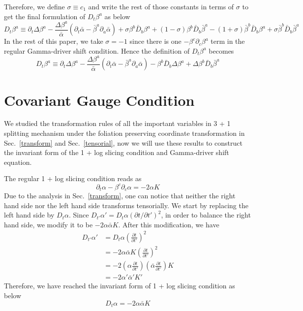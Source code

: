 \documentclass[letterpaper,nofootinbib,prd,amsmath,onecolumn]{revtex4-1}
\begin{document}
Therefore, we define $\sigma \equiv c_{1}$ and write the rest of those constants in terms of $\sigma$ to get the final formulation of $D_{t}\beta^{a}$ as below
\begin{equation}
D_{t}\beta^{a} \equiv \partial_{t}\Delta \beta^{a} - \frac{\Delta \beta^{a}}{{\bar \alpha}}(\partial_{t}{\bar \alpha} - {\bar \beta}^{a}\partial_{a}{\bar \alpha}) + \sigma\beta^{b}{\bar D}_{b}\beta^{a} + (1-\sigma)\beta^{b}{\bar D}_{b}{\bar \beta}^{a} - (1 + \sigma){\bar \beta}^{b}{\bar D}_{b}\beta^{a} + \sigma{\bar \beta}^{b}{\bar D}_{b}{\bar \beta}^{a}
\end{equation}
In the rest of this paper, we take $\sigma = -1$ since there is one $-\beta^{c}\partial_{c}\beta^{a}$ term in the regular Gamma-driver shift condition. Hence the definition of $D_{t}\beta^{a}$ becomes
\begin{equation}
D_{t}\beta^{a} \equiv \partial_{t}\Delta \beta^{a} - \frac{\Delta \beta^{a}}{{\bar \alpha}}(\partial_{t}{\bar \alpha} - {\bar \beta}^{a}\partial_{a}{\bar \alpha}) - \beta^{b}{\bar D}_{b}\Delta \beta^{a} + \Delta \beta^{b}{\bar D}_{b}{\bar \beta}^{a}
\end{equation}

\section{Covariant Gauge Condition}\label{gauge}
We studied the transformation rules of all the important variables in 3 + 1 splitting mechanism under the foliation preserving coordinate transformation in Sec.~\ref{transform} and Sec.~\ref{tensorial}, now we will use these results to construct the invariant form of the 1 + log slicing condition and Gamma-driver shift equation. 

The regular 1 + log slicing condition reads as
\begin{equation}\label{1 + log slicing}
\partial_{t}\alpha - \beta^{c}\partial_{c}\alpha = -2\alpha K
\end{equation}
Due to the analysis in Sec.~\ref{transform}, one can notice that neither the right hand side nor the left hand side transforms tensorially. We start by replacing the left hand side by $D_{t}\alpha$. Since $D_{t'}\alpha' = D_{t}\alpha(\partial t/\partial t')^{2}$, in order to balance the right hand side, we modify it to be $-2\alpha {\bar \alpha}K$. After this modification, we have
\begin{align*}
D_{t'}\alpha' & = D_{t}\alpha\left(\frac{\partial t}{\partial t'}\right)^{2}\\
& = -2\alpha{\bar \alpha}K\left(\frac{\partial t}{\partial t'}\right)^{2}\\
& = -2\left(\alpha\frac{\partial t}{\partial t'}\right)\left({\bar \alpha}\frac{\partial t}{\partial t'}\right)K\\
& = -2\alpha'{\bar \alpha}'K'
\end{align*}
Therefore, we have reached the invariant form of 1 + log slicing condition as below
\begin{equation}\label{invariant 1 + log slicing}
D_{t}\alpha = -2\alpha{\bar \alpha}K
\end{equation}
\end{document}
